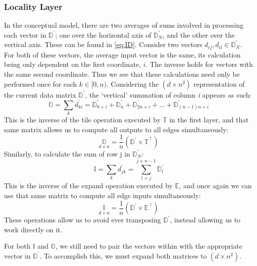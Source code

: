 \subsubsection{Locality Layer}
\label{subsubsec:matconvlayer}
In the conceptual model, there are two averages of sums involved in processing 
each vector in $\mathbb{D}^\prime$; one over the horizontal axis of 
$\mathbb{D}^\prime_N$, and the other over the vertical axis. These can be found 
in \eqref{eq:ID}. Consider two vectors $d_{ij}, d_{il} \in \mathbb{D}^\prime_N$.  
For both of these vectors, the average input vector is the same, its calculation 
being only dependent on the first coordinate, $i$. The inverse holds for vectors 
with the same second coordinate. Thus we see that these calculations need only 
be performed once for each $k \in [0,n)$. Considering the $(d \times n^2)$ 
representation of the current data matrix $\mathbb{D}^\prime$, the `vertical' 
summation of column \textit{i} appears as such:
\[
	\mathbb{O} = \sum_k d^\prime_{ki} = \mathbb{D}^\prime_{0+i} + 
	\mathbb{D}^\prime_n + \mathbb{D}^\prime_{2n + i} + \dots + 
	\mathbb{D}^\prime_{(n-1)n + i}
\]
This is the inverse of the tile operation executed by $\mathbb{T}$ in the first 
layer, and that same matrix allows us to compute all outputs to all edges 
simultaneously:
\begin{equation}
	\underset{d \times n}{\mathbb{O}} = \frac{1}{n} \left(\mathbb{D}^\prime 
	\times \mathbb{T}^\top\right)
\end{equation}
Similarly, to calculate the sum of row j in $\mathbb{D}^\prime_N$:
\[
	\mathbb{I} = \sum_k d^\prime_{jk} = \sum_{l=j}^{j + n-1} \mathbb{D}^\prime_l
\]
This is the inverse of the expand operation executed by $\mathbb{E}$, and once 
again we can use that same matrix to compute all edge inputs simultaneously:
\begin{equation}
	\underset{d \times n}{\mathbb{I}} = \frac{1}{n}\left(\mathbb{D}^\prime 
	\times \mathbb{E}^\top \right)
\end{equation}
These operations allow us to avoid ever transposing $\mathbb{D}^\prime$, instead 
allowing us to work directly on it.

For both $\mathbb{I}$ and $\mathbb{O}$, we still need to pair the vectors within 
with the appropriate vector in $\mathbb{D}^\prime$. To accomplish this, we must 
expand both matrices to $(d \times n^2)$. 

